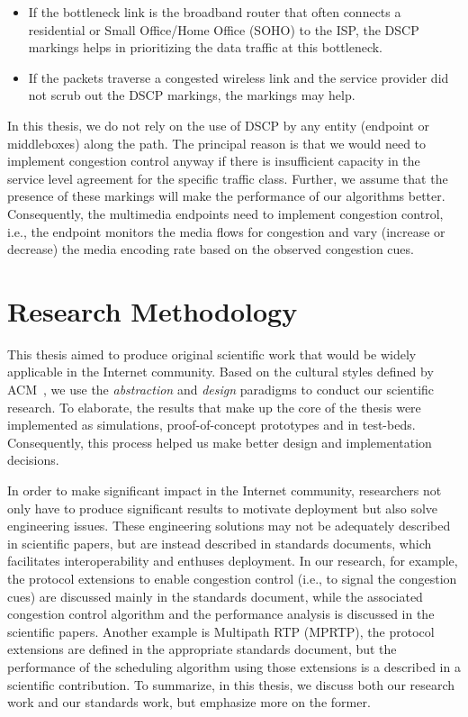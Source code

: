 \begin{itemize}

  \item If the bottleneck link is the broadband router that often connects a
  residential or Small Office/Home Office (SOHO) to the ISP, the DSCP markings
  helps in prioritizing the data traffic at this bottleneck.

  \item If the packets traverse a congested wireless link and the service
  provider did not scrub out the DSCP markings, the markings may help.

\end{itemize}

In this thesis, we do not rely on the use of DSCP by any entity (endpoint or
middleboxes) along the path. The principal reason is that we would need to
implement congestion control anyway if there is insufficient capacity in the
service level agreement for the specific traffic class. Further, we assume
that the presence of these markings will make the performance of our
algorithms better. Consequently, the multimedia endpoints need to implement
congestion control, i.e., the endpoint monitors the media flows for congestion
and vary (increase or decrease) the media encoding rate based on the observed
congestion cues.


\section{Research Methodology}

This thesis aimed to produce original scientific work that would be widely
applicable in the Internet community. Based on the cultural styles defined by
ACM~\cite{Denning:CS.Method}, we use the \textit{abstraction} and
\textit{design} paradigms to conduct our scientific research. To elaborate,
the results that make up the core of the thesis were implemented as
simulations, proof-of-concept prototypes and in test-beds. Consequently, this
process helped us make better design and implementation decisions.

In order to make significant impact in the Internet community, researchers not
only have to produce significant results to motivate deployment but also solve
engineering issues. These engineering solutions may not be adequately
described in scientific papers, but are instead described in standards
documents, which facilitates interoperability and enthuses deployment. In our
research,  for example, the protocol extensions to enable congestion control
(i.e., to signal the congestion cues) are discussed mainly in the standards
document, while the associated congestion control algorithm and the
performance analysis is discussed in the scientific papers. Another example is
Multipath RTP (MPRTP), the protocol extensions are defined in the appropriate
standards document, but the performance of the scheduling algorithm using
those extensions is a described in a scientific contribution. To summarize, in
this thesis, we discuss both our research work and our standards work, but
emphasize more on the former.

